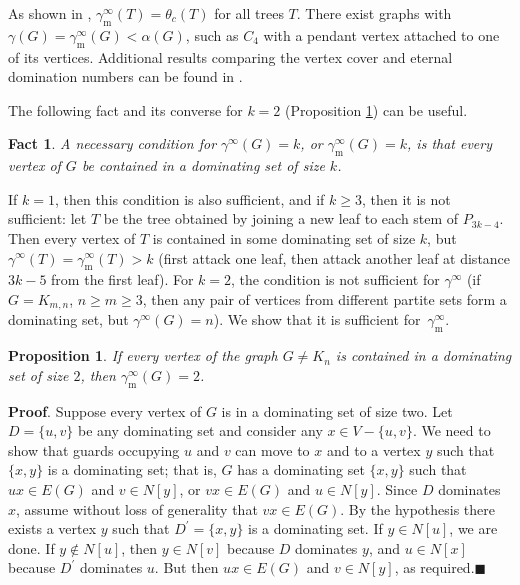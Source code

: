 \documentclass[12pt]{article}%
\newtheorem{Fact}[theorem]{Fact}
\newtheorem{proposition}[theorem]{Proposition}
\begin{document}
\medskip

As shown in \cite{KM2}, $\gamma_{\mathrm{m}}^{\infty}(T)=\theta_{c}(T)$ for
all trees $T$. There exist graphs with $\gamma(G)=\gamma_{\mathrm{m}}^{\infty
}(G)<\alpha(G)$, such as $C_{4}$ with a pendant vertex attached to one of its
vertices. Additional results comparing the vertex cover and eternal domination
numbers can be found in \cite{KM6}.

The following fact and its converse for $k=2$ (Proposition \ref{Prop_gamma2})
can be useful.

\begin{Fact}
\label{Fact_Necessary}A necessary condition for $\gamma^{\infty}(G)=k$, or
$\gamma_{\mathrm{m}}^{\infty}(G)=k$, is that every vertex of $G$ be contained
in a dominating set of size $k$.
\end{Fact}

If $k=1$, then this condition is also sufficient, and if $k\geq3$, then it is
not sufficient: let $T$ be the tree obtained by joining a new leaf to each
stem of $P_{3k-4}$. Then every vertex of $T$ is contained in some dominating
set of size $k$, but $\gamma^{\infty}(T)=\gamma_{\mathrm{m}}^{\infty}(T)>k$
(first attack one leaf, then attack another leaf at distance $3k-5$ from the
first leaf). For $k=2$, the condition is not sufficient for $\gamma^{\infty}$
(if $G=K_{m,n}$, $n\geq m\geq3$, then any pair of vertices from different
partite sets form a dominating set, but $\gamma^{\infty}(G)=n$). We show that
it is sufficient for~$\gamma_{\mathrm{m}}^{\infty}$.

\begin{proposition}
\label{Prop_gamma2}If every vertex of the graph $G\neq K_{n}$ is contained in
a dominating set of size $2$, then $\gamma_{\mathrm{m}}^{\infty}(G)=2$.
\end{proposition}

\noindent\textbf{Proof}.\hspace{0.1in} Suppose every vertex of $G$ is in a
dominating set of size two. Let $D=\{u,v\}$ be any dominating set and consider
any $x\in V-\{u,v\}$. We need to show that guards occupying $u$ and $v$ can
move to $x$ and to a vertex $y$ such that $\{x,y\}$ is a dominating set; that
is, $G$ has a dominating set $\{x,y\}$ such that $ux\in E(G)$ and $v\in N[y]$,
or $vx\in E(G)$ and $u\in N[y]$. Since $D$ dominates $x$, assume without loss
of generality that $vx\in E(G)$. By the hypothesis there exists a vertex $y$
such that $D^{\prime}=\{x,y\}$ is a dominating set. If $y\in N[u]$, we are
done. If $y\notin N[u]$, then $y\in N[v]$ because $D$ dominates $y$, and $u\in
N[x]$ because $D^{\prime}$ dominates $u$. But then $ux\in E(G)$ and $v\in
N[y]$, as required.\hfill$\blacksquare$
\end{document}
